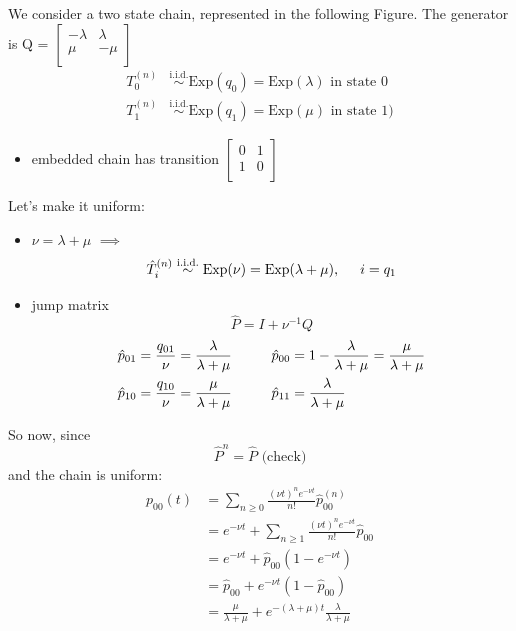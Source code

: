 \documentclass{article}
\begin{document}
\begin{example}
	We consider a two state chain, represented in the following Figure. The generator is Q = 
	$\begin{bmatrix}
		-\lambda & \lambda \\
		\mu & - \mu \\
	\end{bmatrix}$
	\begin{align*}
		T^{(n)}_0 &\stackrel{\text{i.i.d.}}\sim\text{Exp}(q_0) = \text{Exp} (\lambda) \text{  in state $0$} \\
		T^{(n)}_1 &\stackrel{\text{i.i.d.}}\sim\text{Exp}(q_1) = \text{Exp} (\mu) \text{  in state $1$)}
	\end{align*}
	\begin{itemize}
		\item embedded chain has transition
		$\begin{bmatrix}
			0 & 1 \\
			1 & 0 \\
		\end{bmatrix}$
	\end{itemize}
	Let's make it uniform:
	\begin{itemize}
		\item $\nu = \lambda + \mu$
		$\implies $
		\begin{equation*}
			\hat{T}^{(n)}_i \stackrel{\text{i.i.d.}}{\sim} \text{Exp}(\nu) = \text{Exp}(\lambda +\mu), \hspace{0.5 cm} i = q_1
		\end{equation*}
		\item jump matrix
		\begin{equation*}
			\hat{P}= I + \nu^{-1} Q
		\end{equation*}
		\begin{align*}
			\hat{p}_{01} = \frac{q_{01}}{\nu} = \frac{\lambda}{\lambda + \mu} & \hspace{1 cm} \hat{p}_{00} = 1 - \frac{\lambda}{\lambda + \mu} = \frac{\mu}{\lambda + \mu} \\
			\hat{p}_{10} = \frac{q_{10}}{\nu} = \frac{\mu}{\lambda + \mu} & \hspace{1 cm} \hat{p}_{11} =\frac{\lambda}{\lambda + \mu}  
		\end{align*}
	\end{itemize}
	So now, since 
	\begin{equation*}
		\hat{P}^{n} = \hat{P}  \text{    (check)}
	\end{equation*}
	and the chain is uniform:
	\begin{align*}
		p_{00}(t) &= \sum_{n \geq 0} \frac{(\nu t) ^n e^{-\nu t}}{n!} \hat{p}_{00}^{(n)}\\
		&= e^{-\nu t} + \sum_{n \geq 1} \frac{(\nu t) ^n e^{-\nu t}}{n!} \hat{p}_{00} \\
		&= e^{-\nu t} + \hat{p}_{00}(1-e^{-\nu t})\\
		&= \hat{p}_{00} + e^{-\nu t}(1-\hat{p}_{00}) \\
		&= \frac{\mu}{\lambda + \mu} + e^{-(\lambda + \mu) t} \frac{\lambda}{\lambda + \mu}
	\end{align*} 
\end{example}
\end{document}
